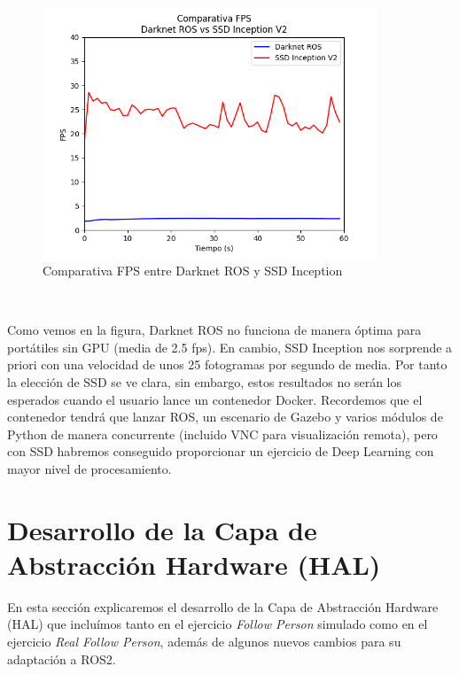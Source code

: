 \begin{figure} [H]
  \begin{center}
    \includegraphics[width=10cm]{imagenes/comparativa-fps-models.png}
  \end{center}
  \caption[Comparativa FPS entre Darknet ROS y SSD Inception]{Comparativa FPS entre Darknet ROS y SSD Inception}
  \label{fig:comparativa_fps_models}
\end{figure}\

Como vemos en la figura, Darknet ROS no funciona de manera óptima para portátiles sin GPU (media de 2.5 fps). En cambio, SSD Inception nos sorprende a priori con una velocidad de unos 25 fotogramas por segundo de media. Por tanto la elección de SSD se ve clara, sin embargo, estos resultados no serán los esperados cuando el usuario lance un contenedor Docker. Recordemos que el contenedor tendrá que lanzar ROS, un escenario de Gazebo y varios módulos de Python de manera concurrente (incluido VNC para visualización remota), pero con SSD habremos conseguido proporcionar un ejercicio de Deep Learning con mayor nivel de procesamiento.\\




\section{Desarrollo de la Capa de Abstracción Hardware (HAL)}
\label{sec:hal_sim_follow_person}

En esta sección explicaremos el desarrollo de la Capa de Abstracción Hardware (HAL) que incluímos tanto en el ejercicio \textit{Follow Person} simulado como en el ejercicio \textit{Real Follow Person}, además de algunos nuevos cambios para su adaptación a ROS2.\\

